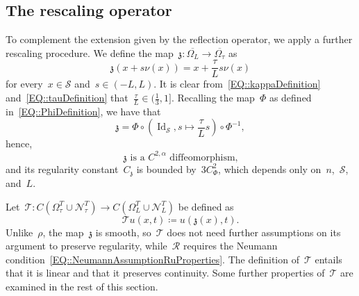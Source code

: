 \documentclass[12pt,a4paper]{amsart}
\numberwithin{equation}{section}
\theoremstyle{definition}
\theoremstyle{remark}
\begin{document}
\subsection{The rescaling operator}
To complement the extension given by the reflection operator, we apply a further rescaling procedure. We define the map~$\mathfrak{z} \colon \overline{\Omega_L} \to \overline{\Omega_\tau}$ as
\begin{equation}\label{EQ::zetaDefinition}
    \mathfrak{z}(x + s \nu (x)) = x + \frac{\tau}{L} s \nu (x)
\end{equation}
for every~$x \in \mathcal{S}$ and~$s \in (-L,L)$. It is clear from~\eqref{EQ::kappaDefinition} and~\eqref{EQ::tauDefinition} that~$\frac{\tau}{L} \in (\frac{1}{3},1]$. Recalling the map~$\Phi$ as defined in~\eqref{EQ::PhiDefinition}, we have that %
\begin{equation}
    \mathfrak{z} = \Phi \circ \left(\operatorname{Id}_\mathcal{S}, s \mapsto \frac{\tau}{L}s\right) \circ \Phi^{-1},
\end{equation}
hence,
\begin{equation}\label{EQ::zetaIsC2aDiffeo}
    \mathfrak{z} \text{ is a }C^{2,\alpha}\text{ diffeomorphism,}
\end{equation}
and its regularity constant~$C_\mathfrak{z}$ is bounded by~$3C_\Phi^2$, which depends only on~$n$,~$\mathcal{S}$, and~$L$.

Let~$\mathcal{T} \colon C(\Omega_\tau^T \cup \mathcal{N}_\tau^T) \to C(\Omega_L^T \cup \mathcal{N}_L^T)$ be defined as
\begin{equation}\label{EQ::TuAsComposition}
    \mathcal{T}u(x,t) \coloneq u(\mathfrak{z}(x), t).
\end{equation}
Unlike~$\rho$, the map~$\mathfrak{z}$ is smooth, so~$\mathcal{T}$ does not need further assumptions on its argument to preserve regularity, while~$\mathcal{R}$ requires the Neumann condition~\eqref{EQ::NeumannAssumptionRuProperties}. The definition of~$\mathcal{T}$ entails that it is linear and that it preserves continuity. Some further properties of~$\mathcal{T}$ are examined in the rest of this section.
\end{document}
